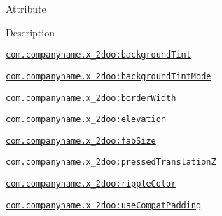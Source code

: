 Attribute

Description 

{\tt \hyperlink{classandroid_1_1support_1_1v4_1_1_r_1_1styleable_3539f4438fb7bb45fef80a07f3887d5a}{com.companyname.x\_\-2doo:backgroundTint}}

{\tt \hyperlink{classandroid_1_1support_1_1v4_1_1_r_1_1styleable_c8d02e9d241d20ca06568db8e4b38c1c}{com.companyname.x\_\-2doo:backgroundTintMode}}

{\tt \hyperlink{classandroid_1_1support_1_1v4_1_1_r_1_1styleable_b0ddfe0b4c79c8941063e2650af4a9e3}{com.companyname.x\_\-2doo:borderWidth}}

{\tt \hyperlink{classandroid_1_1support_1_1v4_1_1_r_1_1styleable_21d6aad3ec0a6bd9aa987ca685e4c166}{com.companyname.x\_\-2doo:elevation}}

{\tt \hyperlink{classandroid_1_1support_1_1v4_1_1_r_1_1styleable_47e11e2375cc45dd871a519e2df82ea3}{com.companyname.x\_\-2doo:fabSize}}

{\tt \hyperlink{classandroid_1_1support_1_1v4_1_1_r_1_1styleable_c267ca537f8a9cb13d80afdbd16d457d}{com.companyname.x\_\-2doo:pressedTranslationZ}}

{\tt \hyperlink{classandroid_1_1support_1_1v4_1_1_r_1_1styleable_a03ae583d77273636cb0e624e75b3148}{com.companyname.x\_\-2doo:rippleColor}}

{\tt \hyperlink{classandroid_1_1support_1_1v4_1_1_r_1_1styleable_ae0dde9e7a05bead4f8562d2d2696661}{com.companyname.x\_\-2doo:useCompatPadding}}

